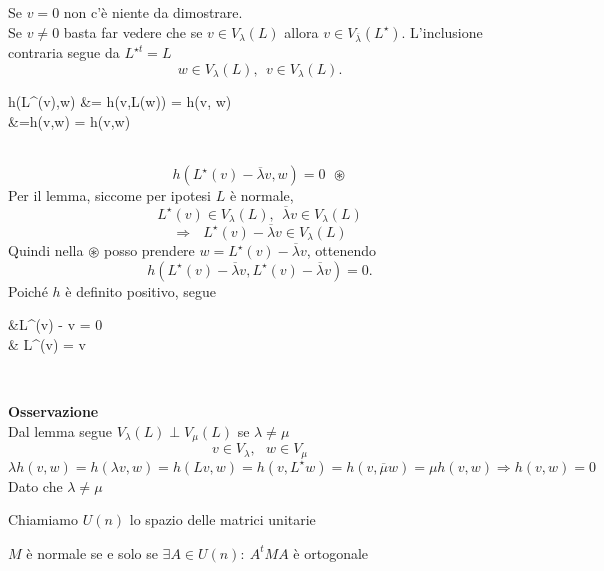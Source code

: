 \documentclass[12px]{article}
\begin{document}
	\begin{dimo}
		Se $v = 0$ non c'è niente da dimostrare.\\
		Se $v \neq 0$ basta far vedere che se $v\in V_ \lambda (L)$ allora $v\in V_{\overline{ \lambda}}(L^\star)$. L'inclusione contraria segue da $L^{\star t} = L$
		 \[
		w\in V_ \lambda (L), \ \ v\in V_ \lambda (L)
		.\] 
		\begin{aligned}
			\hspace{80px}h(L^\star(v),w) &= h(v,L(w)) = h(v, \lambda w)\\
					&=\overline{ \lambda}h(v,w) = h(\overline{ \lambda}v,w)
		\end{aligned}\\
		\[
			h(L^\star(v) - \overline{ \lambda}v,w) = 0 \ \ \circledast
		\] 
		Per il lemma, siccome per ipotesi $L$ è normale, 
		 \[
		L^\star (v)\in V_\lambda (L), \ \ \overline{
		\lambda}v\in V_ \lambda (L)
		\] 
		\[
			\Rightarrow \ \ \ L^\star (v) - \overline{ \lambda} v\in V_ \lambda (L)
		\] 
		Quindi nella $\circledast$ posso prendere $w = L^\star (v) - \overline{ \lambda} v$, ottenendo 
		\[
			h(L^\star (v) - \overline{ \lambda} v, L^\star (v) - \overline{\lambda} v) = 0
		.\] 
		Poiché $h$ è definito positivo, segue\\
		\begin{aligned}
			&L^\star(v) - \overline{ \lambda}v = 0\\
			 \hspace{50px}  & L^\star (v) = \overline{ \lambda} v
		\end{aligned}\\
	\end{dimo}
	\textbf{Osservazione}\\
	Dal lemma segue $V_ \lambda(L) \perp V_\mu (L)$ se $ \lambda \neq \mu$
	\[
	v\in V_ \lambda, \ \ \ w\in V_\mu
	\] 
	\[
		\lambda h(v,w) = h( \lambda v,w) = h(Lv,w) = h(v,L^\star w) = h(v, \overline{\mu}w) = \mu h(v,w) \Rightarrow  h(v,w) = 0
	\]
	Dato che $ \lambda \neq \mu$
	\begin{nome}
		Chiamiamo $U(n)$ lo spazio delle matrici unitarie\\
	\end{nome}
	 \begin{teo}[Spettrale]
	 	$M$ è normale se e solo se $\exists A\in U(n) : \ A^tMA$ è ortogonale
	 \end{teo}
\end{document}
